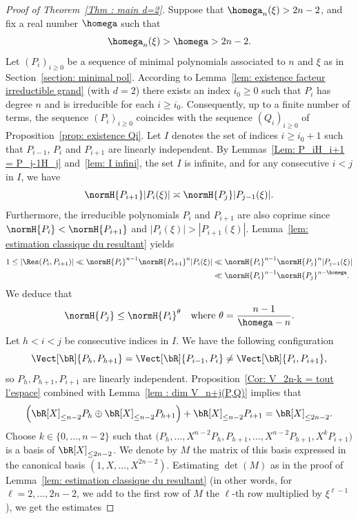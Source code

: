 \begin{proof}[Proof of Theorem~\ref{Thm : main d=2}]
Suppose that $\homega_n(\xi) > 2n-2$, and fix a real number $\homega$ such that
\[
\homega_n(\xi) > \homega > 2n-2.
\]
Let $(P_i)_{i\geq 0}$ be a sequence of minimal polynomials associated to $n$ and $\xi$ as in Section~\ref{section: minimal pol}. According to Lemma~\ref{lem: existence facteur irreductible grand} (with $d=2$) there exists an index $i_0\geq 0$ such that $P_i$ has degree $n$ and is irreducible for each $i\geq i_0$. Consequently, up to a finite number of terms, the sequence $(P_i)_{i\geq 0}$ coincides with the sequence $(Q_i)_{i\geq 0}$ of Proposition~\ref{prop: existence Qi}. Let $I$ denotes the set of indices $i\geq i_0+1$ such that $P_{i-1}$, $P_i$ and $P_{i+1}$ are linearly independent. By Lemmas~\ref{Lem: P_iH_i+1 = P_j-1H_j} and~\ref{lem: I infini}, the set $I$ is infinite, and for any consecutive $i<j$ in $I$, we have
\[
\normH{P_{i+1}}|P_i(\xi)| \asymp \normH{P_j}|P_{j-1}(\xi)|.
\]
Furthermore, the irreducible polynomials $P_i$ and $P_{i+1}$ are also coprime since $\normH{P_i} < \normH{P_{i+1}}$ and $|P_i(\xi)| > |P_{i+1}(\xi)|$. Lemma~\ref{lem: estimation classique du resultant} yields
\begin{align*}
1 \leq |\Res(P_i,P_{i+1})| \ll \normH{P_i}^{n-1}\normH{P_{i+1}}^n|P_{i}(\xi)| &\ll \normH{P_i}^{n-1}\normH{P_{j}}^n|P_{j-1}(\xi)| \\
& \ll \normH{P_i}^{n-1}\normH{P_{j}}^{n-\homega}.
\end{align*}
We deduce that
\begin{equation}
\label{eq proof: estimation theta}
\normH{P_{j}} \leq \normH{P_i}^\theta \quad \textrm{where } \theta = \frac{n-1}{\homega-n}.
\end{equation}
Let $h<i<j$ be consecutive indices in $I$. We have the following configuration
\[
\Vect[\bR]{P_h,P_{h+1}} = \Vect[\bR]{P_{i-1},P_{i}} \neq \Vect[\bR]{P_{i},P_{i+1}},
\]
so $P_{h}, P_{h+1}, P_{i+1}$ are linearly independent. Proposition~\ref{Cor: V_2n-k = tout l'espace} combined with Lemma~\ref{lem : dim V_n+j(P,Q)} implies that
\begin{equation*}
\Big(\bR[X]_{\leq n-2}P_{h}\oplus \bR[X]_{\leq n-2}P_{h+1}\Big) + \bR[X]_{\leq n-2}P_{i+1} = \bR[X]_{\leq 2n-2}.
\end{equation*}
Choose $k\in\{0,\dots,n-2\}$ such that $\big(P_{h},\dots,X^{n-2}P_{h},P_{h+1},\dots,X^{n-2}P_{h+1}, X^kP_{i+1}\big)$ is a basis of $\bR[X]_{\leq 2n-2}$. We denote by $M$ the matrix of this basis expressed in the canonical basis $(1,X,\dots,X^{2n-2})$. Estimating $\det(M)$ as in the proof of Lemma~\ref{lem: estimation classique du resultant} (in other words, for $\ell=2,\dots,2n-2$, we add to the first row of $M$ the $\ell$-th row multiplied by $\xi^{\ell-1}$), we get the estimates

\end{proof}
